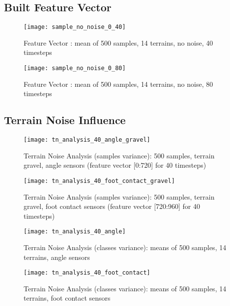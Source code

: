 \subsection{Built Feature Vector} \label{ssec:built_feature_vectors}

\begin{figure}[H]
  \centering
  \texttt{[image: sample\_no\_noise\_0\_40]}
  \caption{Feature Vector : mean of 500 samples, 14 terrains, no noise, 40 timesteps}
  \label{fig:sample_40t}
\end{figure}


\begin{figure}[H]
  \centering
  \texttt{[image: sample\_no\_noise\_0\_80]}
  \caption{Feature Vector : mean of 500 samples, 14 terrains, no noise, 80 timesteps}
  \label{fig:sample_80t}
\end{figure}

\subsection{Terrain Noise Influence} \label{ssec:terrain_noise_influence}

\begin{figure}[H]
  \centering
  \texttt{[image: tn\_analysis\_40\_angle\_gravel]}
  \caption{Terrain Noise Analysis (samples variance): 500 samples, terrain gravel, angle sensors (feature vector [0:720] for 40 timesteps)}
  \label{fig:tn_analysis_angle_gravel}
\end{figure}

\begin{figure}[H]
  \centering
  \texttt{[image: tn\_analysis\_40\_foot\_contact\_gravel]}
  \caption{Terrain Noise Analysis (samples variance): 500 samples, terrain gravel, foot contact sensors (feature vector [720:960] for 40 timesteps)}
  \label{fig:tn_analysis_foot_contact_gravel}
\end{figure}

\begin{figure}[H]
  \centering
  \texttt{[image: tn\_analysis\_40\_angle]}
  \caption{Terrain Noise Analysis (classes variance): means of 500 samples, 14 terrains, angle sensors}
  \label{fig:tn_analysis_angle}
\end{figure}

\begin{figure}[H]
  \centering
  \texttt{[image: tn\_analysis\_40\_foot\_contact]}
  \caption{Terrain Noise Analysis (classes variance): means of 500 samples, 14 terrains, foot contact sensors}
  \label{fig:tn_analysis_foot_contact}
\end{figure}

